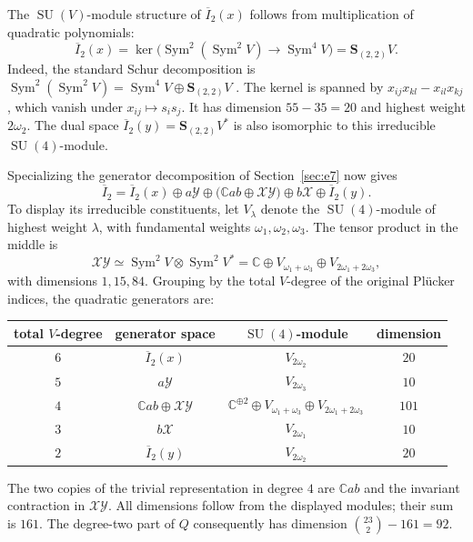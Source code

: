 \documentclass[11pt]{article}
\newcommand{\C}{\mathbb C}
\newcommand{\Sym}{\operatorname{Sym}}
\newcommand{\SU}{\operatorname{SU}}
\newcommand{\bS}{\mathbf S}
\theoremstyle{definition}
\numberwithin{equation}{section}
\begin{document}
The $\SU(V)$-module structure of $\overline I_2(x)$ follows from
multiplication of quadratic polynomials:
\[
 \overline I_2(x)
 =\ker\bigl(\Sym^2(\Sym^2V)\longrightarrow\Sym^4V\bigr)
 =\bS_{(2,2)}V.
\]
Indeed, the standard Schur decomposition is
$\Sym^2(\Sym^2V)=\Sym^4V\oplus\bS_{(2,2)}V$
\cite[Section~1.2]{Ottaviani}. The kernel is spanned by
$x_{ij}x_{kl}-x_{il}x_{kj}$, which vanish under $x_{ij}\mapsto s_is_j$.
It has dimension $55-35=20$ and highest weight $2\omega_2$.
The dual space $\overline I_2(y)=\bS_{(2,2)}V^*$ is also
isomorphic to this irreducible $\SU(4)$-module.

Specializing the generator decomposition of Section~\ref{sec:e7}
now gives
\[
 \overline I_2=\overline I_2(x)\oplus a\mathcal Y
 \oplus\bigl(\C ab\oplus\mathcal X\mathcal Y\bigr)
 \oplus b\mathcal X\oplus\overline I_2(y).
\]
To display its irreducible constituents, let $V_\lambda$ denote
the $\SU(4)$-module of highest weight $\lambda$, with fundamental
weights $\omega_1,\omega_2,\omega_3$. The tensor product in the
middle is
\[
 \mathcal X\mathcal Y\simeq\Sym^2V\otimes\Sym^2V^*
 =\C\oplus V_{\omega_1+\omega_3}
       \oplus V_{2\omega_1+2\omega_3},
\]
with dimensions $1,15,84$. Grouping by the total $V$-degree of the
original Pl\"ucker indices, the quadratic generators are:
\begin{center}
\begin{tabular}{c c c c}
\toprule
total $V$-degree & generator space & $\SU(4)$-module & dimension \\
\midrule
$6$ & $\overline I_2(x)$ & $V_{2\omega_2}$ & $20$ \\
$5$ & $a\mathcal Y$ & $V_{2\omega_3}$ & $10$ \\
$4$ & $\C ab\oplus\mathcal X\mathcal Y$
 & $\C^{\oplus2}\oplus V_{\omega_1+\omega_3}\oplus V_{2\omega_1+2\omega_3}$ & $101$ \\
$3$ & $b\mathcal X$ & $V_{2\omega_1}$ & $10$ \\
$2$ & $\overline I_2(y)$ & $V_{2\omega_2}$ & $20$ \\
\bottomrule
\end{tabular}
\end{center}
The two copies of the trivial representation in degree $4$ are
$\C ab$ and the invariant contraction in $\mathcal X\mathcal Y$.
All dimensions follow from the displayed modules; their sum is $161$.
The degree-two part of $Q$ consequently has dimension
$\binom{23}{2}-161=92$.
\end{document}
